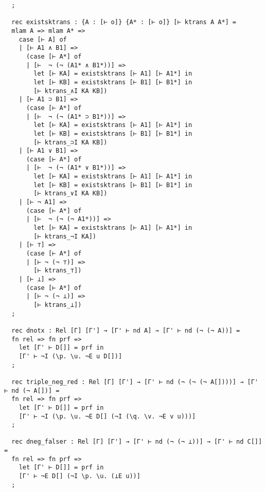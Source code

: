 \documentclass{article}
\begin{document}
\begin{lstlisting}
  ;
  
  rec existsktrans : {A : [⊢ o]} {A* : [⊢ o]} [⊢ ktrans A A*] = 
  mlam A => mlam A* =>
    case [⊢ A] of
    | [⊢ A1 ∧ B1] =>
      (case [⊢ A*] of
      | [⊢  ¬ (¬ (A1* ∧ B1*))] =>
        let [⊢ KA] = existsktrans [⊢ A1] [⊢ A1*] in
        let [⊢ KB] = existsktrans [⊢ B1] [⊢ B1*] in
        [⊢ ktrans_∧I KA KB])
    | [⊢ A1 ⊃ B1] =>
      (case [⊢ A*] of
      | [⊢  ¬ (¬ (A1* ⊃ B1*))] =>
        let [⊢ KA] = existsktrans [⊢ A1] [⊢ A1*] in
        let [⊢ KB] = existsktrans [⊢ B1] [⊢ B1*] in
        [⊢ ktrans_⊃I KA KB])
    | [⊢ A1 ∨ B1] =>
      (case [⊢ A*] of
      | [⊢  ¬ (¬ (A1* ∨ B1*))] =>
        let [⊢ KA] = existsktrans [⊢ A1] [⊢ A1*] in
        let [⊢ KB] = existsktrans [⊢ B1] [⊢ B1*] in
        [⊢ ktrans_∨I KA KB])
    | [⊢ ¬ A1] =>
      (case [⊢ A*] of
      | [⊢  ¬ (¬ (¬ A1*))] =>
        let [⊢ KA] = existsktrans [⊢ A1] [⊢ A1*] in
        [⊢ ktrans_¬I KA])
    | [⊢ ⊤] =>
      (case [⊢ A*] of
      | [⊢ ¬ (¬ ⊤)] =>
        [⊢ ktrans_⊤])
    | [⊢ ⊥] =>
      (case [⊢ A*] of
      | [⊢ ¬ (¬ ⊥)] =>
        [⊢ ktrans_⊥])
  ;
  
  rec dnotx : Rel [Γ] [Γ'] → [Γ' ⊢ nd A] → [Γ' ⊢ nd (¬ (¬ A))] =
  fn rel => fn prf =>
    let [Γ' ⊢ D[]] = prf in
    [Γ' ⊢ ¬I (\p. \u. ¬E u D[])]
  ;
  
  rec triple_neg_red : Rel [Γ] [Γ'] → [Γ' ⊢ nd (¬ (¬ (¬ A[])))] → [Γ' ⊢ nd (¬ A[])] =
  fn rel => fn prf =>
    let [Γ' ⊢ D[]] = prf in
    [Γ' ⊢ ¬I (\p. \u. ¬E D[] (¬I (\q. \v. ¬E v u)))]
  ;
  
  rec dneg_falser : Rel [Γ] [Γ'] → [Γ' ⊢ nd (¬ (¬ ⊥))] → [Γ' ⊢ nd C[]] =
  fn rel => fn prf =>
    let [Γ' ⊢ D[]] = prf in
    [Γ' ⊢ ¬E D[] (¬I \p. \u. (⊥E u))]
  ;
  

\end{lstlisting}
\end{document}
